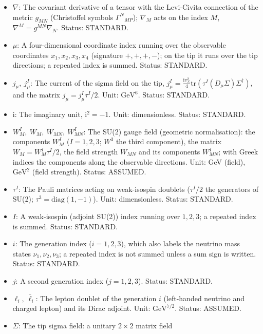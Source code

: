 \documentclass[
  10pt,
]{article}
\providecommand{\tightlist}{%
  \setlength{\itemsep}{0pt}\setlength{\parskip}{0pt}}
\begin{document}
\begin{itemize}
\tightlist
\item
  \(\nabla\): The covariant derivative of a tensor with the Levi-Civita
  connection of the metric \(g_{MN}\) (Christoffel symbols
  \(\Gamma^N{}_{MP}\)); \(\nabla_M\) acts on the index \(M\),
  \(\nabla^M = g^{MN}\nabla_N\). Status: STANDARD.
\item
  \(\mu\): A four-dimensional coordinate index running over the
  observable coordinates \(x_1, x_2, x_3, x_4\) (signature \(+,+,+,-\));
  on the tip it runs over the tip directions; a repeated index is
  summed. Status: STANDARD.
\item
  \(j_\mu,\ j^I_\mu\): The current of the sigma field on the tip,
  \(j^I_\mu = \frac{\mathrm{i}v_\Sigma^2}{4}\mathrm{tr}(\tau^I(D_\mu\Sigma)\Sigma^\dagger)\),
  and the matrix \(j_\mu = j^I_\mu\tau^I/2\). Unit:
  \(\mathrm{GeV}^{6}\). Status: STANDARD.
\item
  \(\mathrm{i}\): The imaginary unit, \(\mathrm{i}^2 = -1\). Unit:
  dimensionless. Status: STANDARD.
\item
  \(W^I_M,\ W_M,\ W_{MN},\ W^I_{MN}\): The SU(2) gauge field (geometric
  normalisation): the components \(W^I_M\) (\(I = 1, 2, 3\); \(W^3\) the
  third component), the matrix \(W_M = W^I_M\tau^I/2\), the field
  strength \(W_{MN}\) and its components \(W^I_{MN}\); with Greek
  indices the components along the observable directions. Unit: GeV
  (field), \(\mathrm{GeV}^{2}\) (field strength). Status: ASSUMED.
\item
  \(\tau^I\): The Pauli matrices acting on weak-isospin doublets
  (\(\tau^I/2\) the generators of SU(2);
  \(\tau^3 = \mathrm{diag}(1, -1)\)). Unit: dimensionless. Status:
  STANDARD.
\item
  \(I\): A weak-isospin (adjoint SU(2)) index running over \(1, 2, 3\);
  a repeated index is summed. Status: STANDARD.
\item
  \(i\): The generation index (\(i = 1, 2, 3\)), which also labels the
  neutrino mass states \(\nu_1, \nu_2, \nu_3\); a repeated index is not
  summed unless a sum sign is written. Status: STANDARD.
\item
  \(j\): A second generation index (\(j = 1, 2, 3\)). Status: STANDARD.
\item
  \(\ell_i,\ \bar\ell_i\): The lepton doublet of the generation \(i\)
  (left-handed neutrino and charged lepton) and its Dirac adjoint. Unit:
  \(\mathrm{GeV}^{7/2}\). Status: ASSUMED.
\item
  \(\Sigma\): The tip sigma field: a unitary \(2 \times 2\) matrix field

\end{itemize}
\end{document}
